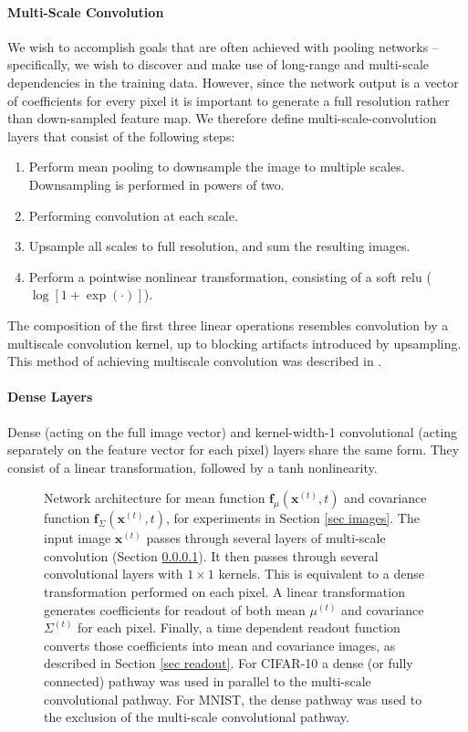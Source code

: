 \documentclass{article}
\newcommand{\mb}{\mathbf}
\begin{document}
\paragraph{Multi-Scale Convolution}\label{sec multiscale}

We wish to accomplish goals that are often achieved with pooling networks -- specifically, we wish to discover and make use of long-range and multi-scale dependencies 
in the training data. However, since the network output is a vector of coefficients for every pixel 
it is important to generate a full resolution rather than down-sampled feature map. We therefore define multi-scale-convolution layers that consist of the following steps:
\begin{enumerate}\itemsep1pt \parskip0pt 
  \item Perform mean pooling to downsample the image to multiple scales. Downsampling is performed in powers of two.
  \item Performing convolution at each scale.
  \item Upsample all scales to full resolution, and sum the resulting images.
  \item Perform a pointwise nonlinear transformation, consisting of a soft relu ($\log\left[ 1 + \exp\left(\cdot \right)\right]$). 
\end{enumerate}
The composition of the first three linear operations resembles convolution by a multiscale convolution kernel, up to blocking artifacts introduced by upsampling. This method of achieving multiscale convolution was described in \cite{Barron2013}.

\paragraph{Dense Layers}

Dense (acting on the full image vector) and kernel-width-1 convolutional (acting separately on the feature vector for each pixel) layers share the same form. 
They consist of a linear transformation, followed by a tanh nonlinearity.

\begin{figure}
\centering
{}
\caption{
Network architecture for mean function $\mb f_\mu\left( \mb x^{(t)}, t \right)$ and covariance function $\mb f_\Sigma\left( \mb x^{(t)}, t \right)$, for experiments 
in Section \ref{sec images}. The input image $\mb x^{(t)}$ passes through several layers of multi-scale convolution (Section \ref{sec multiscale}). 
It then passes through several convolutional layers with $1\times 1$ kernels. This is equivalent to a dense transformation performed on each pixel. 
A linear transformation generates coefficients for readout of both mean $\mu^{(t)}$ and covariance $\Sigma^{(t)}$ for each pixel. 
Finally, a time dependent readout function converts those coefficients into mean and covariance images, as described in Section \ref{sec readout}. 
For CIFAR-10 a dense (or fully connected) pathway was used in parallel to the multi-scale convolutional pathway. For MNIST, the dense pathway was 
used to the exclusion of the multi-scale convolutional pathway.
}
\label{fig architecture}
\end{figure}
\end{document}
